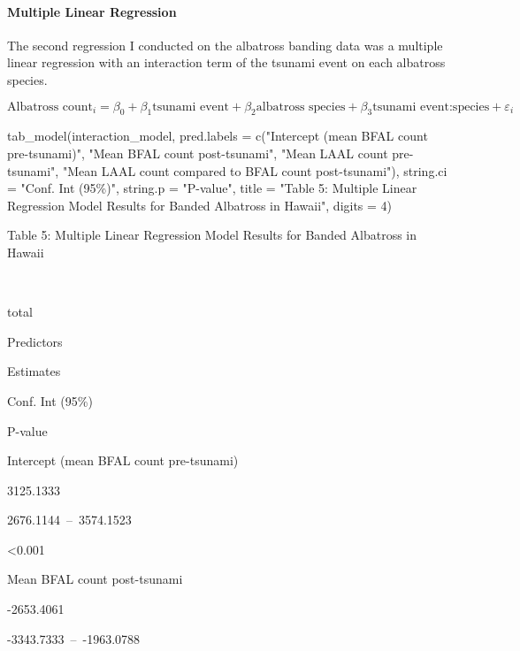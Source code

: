 \documentclass[
]{article}
\newenvironment{Shaded}{\begin{snugshade}}{\end{snugshade}}
\newcommand{\AttributeTok}[1]{\textcolor[rgb]{0.77,0.63,0.00}{#1}}
\newcommand{\DecValTok}[1]{\textcolor[rgb]{0.00,0.00,0.81}{#1}}
\newcommand{\FunctionTok}[1]{\textcolor[rgb]{0.00,0.00,0.00}{#1}}
\newcommand{\NormalTok}[1]{#1}
\newcommand{\StringTok}[1]{\textcolor[rgb]{0.31,0.60,0.02}{#1}}
\begin{document}
\hypertarget{multiple-linear-regression}{%
\paragraph{Multiple Linear
Regression}\label{multiple-linear-regression}}

The second regression I conducted on the albatross banding data was a
multiple linear regression with an interaction term of the tsunami event
on each albatross species.

\[ \text{Albatross count}_i = \beta_0 + \beta_1 \text{tsunami event} + \beta_2 \text{albatross species} + \beta_3\text{tsunami event:species} + \varepsilon_i \]

\begin{Shaded}
\begin{Highlighting}[]
\FunctionTok{tab\_model}\NormalTok{(interaction\_model,}
          \AttributeTok{pred.labels =} \FunctionTok{c}\NormalTok{(}\StringTok{"Intercept (mean BFAL count pre{-}tsunami)"}\NormalTok{, }\StringTok{"Mean BFAL count post{-}tsunami"}\NormalTok{, }\StringTok{"Mean LAAL count pre{-}tsunami"}\NormalTok{, }\StringTok{"Mean LAAL count compared to BFAL count post{-}tsunami"}\NormalTok{),}
          \AttributeTok{string.ci =} \StringTok{"Conf. Int (95\%)"}\NormalTok{,}
          \AttributeTok{string.p =} \StringTok{"P{-}value"}\NormalTok{,}
          \AttributeTok{title =} \StringTok{"Table 5: Multiple Linear Regression Model Results for Banded Albatross in Hawaii"}\NormalTok{,}
          \AttributeTok{digits =} \DecValTok{4}\NormalTok{)}
\end{Highlighting}
\end{Shaded}

Table 5: Multiple Linear Regression Model Results for Banded Albatross
in Hawaii

~

total

Predictors

Estimates

Conf. Int (95\%)

P-value

Intercept (mean BFAL count pre-tsunami)

3125.1333

2676.1144~--~3574.1523

\textless0.001

Mean BFAL count post-tsunami

-2653.4061

-3343.7333~--~-1963.0788
\end{document}
